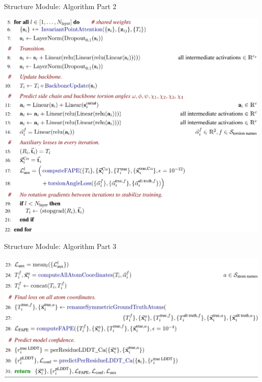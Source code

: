 \documentclass[presentation, smaller]{beamer}
\begin{document}
\begin{frame}[label={sec:org19dff36}]{Structure Module: Algorithm Part 2 \cite{jumperHighlyAccurateProtein2021}}
\begin{center}
\includegraphics[height=0.9\textheight]{./imgs/algo20-part2.png}
\end{center}
\end{frame}

\begin{frame}[label={sec:org5392af1}]{Structure Module: Algorithm Part 3 \cite{jumperHighlyAccurateProtein2021}}
\begin{center}
\includegraphics[width=.9\linewidth]{./imgs/algo20-part3.png}
\end{center}
\end{frame}
\end{document}

